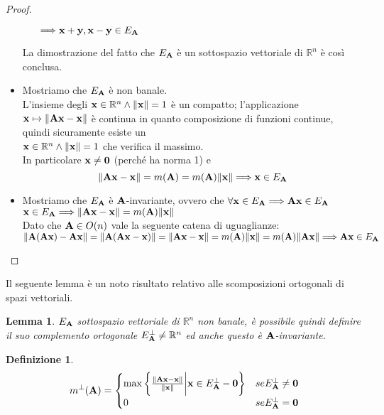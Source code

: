 \documentclass[12pt,a4paper]{book}
\newtheorem{definition}{Definizione}[section]
\newtheorem{lemma}[theorem]{Lemma}
\begin{document}
\begin{proof}
\begin{itemize}
\begin{itemize}
$\Longrightarrow \vb{x+y, x-y} \in E_{\vb{A}} $ 
\end{itemize}  
La dimostrazione del fatto che $E_{\vb{A}}$ è un sottospazio vettoriale di $\mathbb{R}^n $ è così conclusa.
\item Mostriamo che $E_{\vb{A}}$ è non banale.\\
L'insieme degli $\vb{x} \in \mathbb{R}^{n} \land \norm{\vb{x}} = 1$ è un compatto; l'applicazione $ \vb{x} \mapsto \norm{\vb{Ax-x}}$ è continua in quanto composizione di funzioni continue, quindi sicuramente esiste un \\ $\vb{x} \in \mathbb{R}^{n} \land \norm{\vb{x}} = 1$  che  verifica il massimo. \\
In particolare $\vb{x} \neq \vb{0}$  (perché ha norma 1) e 
\[ \norm{\vb{Ax - x}} = m(\vb{A}) = m(\vb{A})\norm{\vb{x}} \Longrightarrow \vb{x} \in E_{\vb{A}}\]
\item Mostriamo che $E_{\vb{A}}$ è $\vb{A}$-invariante, ovvero che  $\forall \vb{x} \in E_{\vb{A}} \Longrightarrow \vb{Ax} \in E_{\vb{A}}$ \\
$\vb{x} \in E_{\vb{A}} \Longrightarrow \norm{\vb{Ax-x}} = m(\vb{A})\norm{\vb{x}} $ \\
Dato che $\vb{A} \in O(n)$ vale la seguente catena di uguaglianze:\\
$ \norm{\vb{A(Ax) - Ax }} =  \norm{\vb{A(Ax-x)}} = \norm{\vb{Ax - x}} = m(\vb{A})\norm{\vb{x}} = m(\vb{A})\norm{\vb{Ax}} \Longrightarrow \vb{Ax} \in E_{\vb{A}}$
\end{itemize} 
\end{proof}
Il seguente lemma è un noto risultato relativo alle scomposizioni ortogonali di spazi vettoriali. 
\begin{lemma}
$E_{\vb{A}}$ sottospazio vettoriale di $\mathbb{R}^n $ non banale, è possibile quindi definire il suo complemento ortogonale $E^{\perp}_{\vb{A}} \neq \mathbb{R}^n$ ed anche questo è $\vb{A}$-invariante. 
\end{lemma} 

\begin{definition}

\[ m^{\perp}(\vb{A}) = \begin{cases} 
      \max \bigg\{ \frac{\norm{\vb{Ax-x}}}{\norm{\vb{x}}} \bigg|  \vb{x} \in E^{\perp}_{\vb{A}} - \vb{0} \bigg\}  &  se   E^{\perp}_{\vb{A}} \neq {\vb{0}} \\
      0 & se   E^{\perp}_{\vb{A}} = {\vb{0}} \\
      
   \end{cases}
\]

\end{definition}
\end{document}
